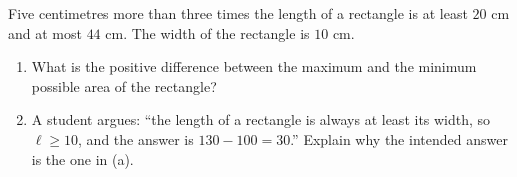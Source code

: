 Five centimetres more than three times the length of a rectangle is at least $20$ cm and at most $44$ cm. The width of the rectangle is $10$ cm.
\begin{enumerate}
\item[(a)] What is the positive difference between the maximum and the minimum possible area of the rectangle?
\item[(b)] A student argues: ``the length of a rectangle is always at least its width, so $\ell\ge10$, and the answer is $130-100=30$.'' Explain why the intended answer is the one in (a).
\end{enumerate}
